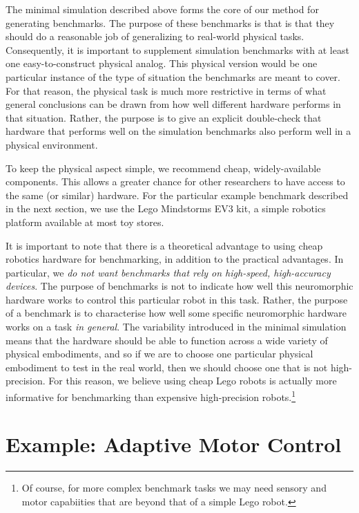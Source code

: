 \documentclass{frontiersSCNS} %
\begin{document}
The minimal simulation described above forms the core of our method for generating benchmarks.
The purpose of these benchmarks is that is that they should do a reasonable job
of generalizing to real-world physical tasks.  Consequently, it is important to
supplement simulation benchmarks with at least one easy-to-construct 
physical analog.  This physical version would be one particular instance of the
type of situation the benchmarks are meant to cover.  For that reason, the physical task
is much more restrictive in terms of what general conclusions can be drawn
from how well different hardware performs in that situation.  Rather, the purpose is to give
an explicit double-check that hardware that performs
well on the simulation benchmarks also perform well in a physical environment.

To keep the physical aspect simple, we recommend cheap, widely-available
components.  This allows a greater chance for other researchers to have
access to the same (or similar) hardware.  For the particular example 
benchmark described in the next section, we use the Lego Mindstorms EV3 kit,
a simple robotics platform available at most toy stores.

It is important to note that there is a theoretical advantage to
using cheap robotics hardware for benchmarking, in addition to the practical
advantages.  In particular, we \emph{do not want benchmarks that rely on
high-speed, high-accuracy devices}.  The purpose of benchmarks
is not to indicate how well this neuromorphic hardware works to control this
particular robot in this task.  Rather, the purpose of a benchmark is to
characterise how well some specific neuromorphic hardware works on a task 
\emph{in general}.  The variability introduced in the minimal simulation means that the hardware
should be able to function across a wide variety of physical embodiments, and
so if we are to choose one particular physical embodiment to test in the
real world, then we should choose one that is not high-precision.
For this reason, we believe using cheap Lego robots is actually more informative
for benchmarking than expensive high-precision robots.\footnote{Of course,
for more complex benchmark tasks we may need sensory and motor capabiities
that are beyond that of a simple Lego robot.}

\section{Example: Adaptive Motor Control}
\end{document}
